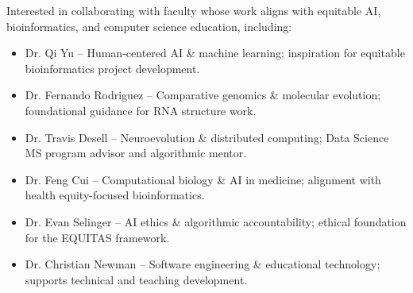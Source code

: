\documentclass[11pt,letterpaper]{article}
\begin{document}
Interested in collaborating with faculty whose work aligns with equitable AI, bioinformatics, and computer science education, including:
\begin{itemize}
    \item Dr. Qi Yu – Human-centered AI \& machine learning; inspiration for equitable bioinformatics project development.
    \item Dr. Fernando Rodriguez – Comparative genomics \& molecular evolution; foundational guidance for RNA structure work.
    \item Dr. Travis Desell – Neuroevolution \& distributed computing; Data Science MS program advisor and algorithmic mentor.
    \item Dr. Feng Cui – Computational biology \& AI in medicine; alignment with health equity-focused bioinformatics.
    \item Dr. Evan Selinger – AI ethics \& algorithmic accountability; ethical foundation for the EQUITAS framework.
    \item Dr. Christian Newman – Software engineering \& educational technology; supports technical and teaching development.
\end{itemize}
\end{document}
